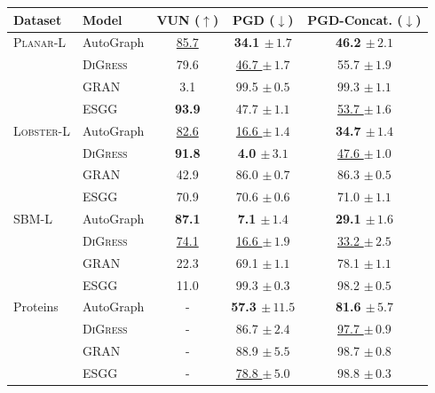 \begin{tabular}{llccc}
\toprule
\textbf{Dataset} & \textbf{Model} & \textbf{VUN ($\uparrow$)} & \textbf{PGD ($\downarrow$)} & \textbf{PGD-Concat. ($\downarrow$)} \\
\midrule
\textsc{Planar-L} & AutoGraph & \underline{85.7} & \textbf{34.1 $\pm\,\scriptstyle{1.7}$} & \textbf{46.2 $\pm\,\scriptstyle{2.1}$} \\
 & \textsc{DiGress} & 79.6 & \underline{46.7 $\pm\,\scriptstyle{1.7}$} & 55.7 $\pm\,\scriptstyle{1.9}$ \\
 & GRAN & 3.1 & 99.5 $\pm\,\scriptstyle{0.5}$ & 99.3 $\pm\,\scriptstyle{1.1}$ \\
 & ESGG & \textbf{93.9} & 47.7 $\pm\,\scriptstyle{1.1}$ & \underline{53.7 $\pm\,\scriptstyle{1.6}$} \\
\midrule
\textsc{Lobster-L} & AutoGraph & \underline{82.6} & \underline{16.6 $\pm\,\scriptstyle{1.4}$} & \textbf{34.7 $\pm\,\scriptstyle{1.4}$} \\
 & \textsc{DiGress} & \textbf{91.8} & \textbf{4.0 $\pm\,\scriptstyle{3.1}$} & \underline{47.6 $\pm\,\scriptstyle{1.0}$} \\
 & GRAN & 42.9 & 86.0 $\pm\,\scriptstyle{0.7}$ & 86.3 $\pm\,\scriptstyle{0.5}$ \\
 & ESGG & 70.9 & 70.6 $\pm\,\scriptstyle{0.6}$ & 71.0 $\pm\,\scriptstyle{1.1}$ \\
\midrule
\textsc{SBM-L} & AutoGraph & \textbf{87.1} & \textbf{7.1 $\pm\,\scriptstyle{1.4}$} & \textbf{29.1 $\pm\,\scriptstyle{1.6}$} \\
 & \textsc{DiGress} & \underline{74.1} & \underline{16.6 $\pm\,\scriptstyle{1.9}$} & \underline{33.2 $\pm\,\scriptstyle{2.5}$} \\
 & GRAN & 22.3 & 69.1 $\pm\,\scriptstyle{1.1}$ & 78.1 $\pm\,\scriptstyle{1.1}$ \\
 & ESGG & 11.0 & 99.3 $\pm\,\scriptstyle{0.3}$ & 98.2 $\pm\,\scriptstyle{0.5}$ \\
\midrule
Proteins & AutoGraph & - & \textbf{57.3 $\pm\,\scriptstyle{11.5}$} & \textbf{81.6 $\pm\,\scriptstyle{5.7}$} \\
 & \textsc{DiGress} & - & 86.7 $\pm\,\scriptstyle{2.4}$ & \underline{97.7 $\pm\,\scriptstyle{0.9}$} \\
 & GRAN & - & 88.9 $\pm\,\scriptstyle{5.5}$ & 98.7 $\pm\,\scriptstyle{0.8}$ \\
 & ESGG & - & \underline{78.8 $\pm\,\scriptstyle{5.0}$} & 98.8 $\pm\,\scriptstyle{0.3}$ \\
\bottomrule
\end{tabular}